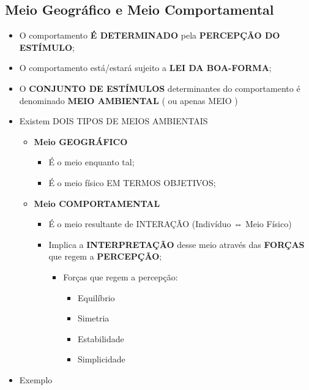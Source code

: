 \documentclass[
]{book}
\providecommand{\tightlist}{%
  \setlength{\itemsep}{0pt}\setlength{\parskip}{0pt}}
\begin{document}
\hypertarget{meio-geogruxe1fico-e-meio-comportamental}{%
\subsection{Meio Geográfico e Meio Comportamental}\label{meio-geogruxe1fico-e-meio-comportamental}}

\begin{itemize}
\tightlist
\item
  O comportamento \textbf{É DETERMINADO} pela \textbf{PERCEPÇÃO DO ESTÍMULO};
\item
  O comportamento está/estará sujeito a \textbf{LEI DA BOA-FORMA};
\item
  O \textbf{CONJUNTO DE ESTÍMULOS} determinantes do comportamento é denominado \textbf{MEIO AMBIENTAL} ( ou apenas MEIO )
\item
  Existem DOIS TIPOS DE MEIOS AMBIENTAIS

  \begin{itemize}
  \tightlist
  \item
    \textbf{Meio GEOGRÁFICO}

    \begin{itemize}
    \tightlist
    \item
      É o meio enquanto tal;
    \item
      É o meio físico EM TERMOS OBJETIVOS;
    \end{itemize}
  \item
    \textbf{Meio COMPORTAMENTAL}

    \begin{itemize}
    \tightlist
    \item
      É o meio resultante de INTERAÇÃO (Indivíduo ⇔ Meio Físico)
    \item
      Implica a \textbf{INTERPRETAÇÃO} desse meio através das \textbf{FORÇAS} que regem a \textbf{PERCEPÇÃO};

      \begin{itemize}
      \tightlist
      \item
        Forças que regem a percepção:

        \begin{itemize}
        \tightlist
        \item
          Equilíbrio
        \item
          Simetria
        \item
          Estabilidade
        \item
          Simplicidade
        \end{itemize}
      \end{itemize}
    \end{itemize}
  \end{itemize}
\item
  Exemplo


\end{itemize}
\end{document}
